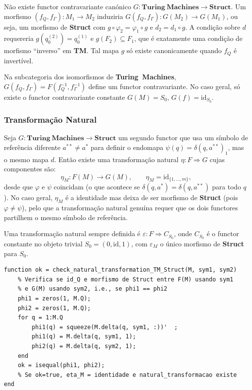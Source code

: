 \begin{proposition}
Não existe functor contravariante canónico $G: \mathbf{Turing\ Machines} \to \mathbf{Struct}$. Um morfismo $(f_Q,f_\Gamma): M_1 \to M_2$ induziria $G(f_Q,f_\Gamma): G(M_2) \to G(M_1)$, ou seja, um morfismo de \textbf{Struct} com $g \circ \varphi_2 = \varphi_1 \circ g$ e $d_2 = d_1 \circ g$. A condição sobre $d$ requereria $g(q_0^{(2)}) = q_0^{(1)}$ e $g(F_2) \subseteq F_1$, que é exatamente uma condição de morfismo ``inverso'' em \textbf{TM}. Tal mapa $g$ só existe canonicamente quando $f_Q$ é invertível.
\end{proposition}

\begin{remark}
Na subcategoria dos isomorfismos de \textbf{Turing\ Machines}, $G(f_Q,f_\Gamma) = F(f_Q^{-1}, f_\Gamma^{-1})$ define um functor contravariante. No caso geral, só existe o functor contravariante constante $G(M) = S_0$, $G(f) = \mathrm{id}_{S_0}$.
\end{remark}

\subsubsection{Transformação Natural}

Seja $G: \mathbf{Turing\ Machines} \to \mathbf{Struct}$ um segundo functor que usa um símbolo de referência diferente $a^{**} \neq a^*$ para definir o endomapa $\psi(q) = \delta(q, a^{**})_1$, mas o mesmo mapa $d$. Então existe uma transformação natural $\eta: F \Rightarrow G$ cujas componentes são:
\[
    \eta_M : F(M) \to G(M), \qquad \eta_M = \mathrm{id}_{\{1,\ldots,m\}},
\]
desde que $\varphi$ e $\psi$ coincidam (o que acontece se $\delta(q, a^*) = \delta(q, a^{**})$ para todo $q$). No caso geral, $\eta_M$ é a identidade mas deixa de ser morfismo de \textbf{Struct} (pois $\varphi \neq \psi$), pelo que a transformação natural genuína requer que os dois functores partilhem o mesmo símbolo de referência.

Uma transformação natural sempre definida é $\varepsilon: F \Rightarrow C_{S_0}$, onde $C_{S_0}$ é o functor constante no objeto trivial $S_0 = (0, \mathrm{id}, 1)$, com $\varepsilon_M$ o único morfismo de \textbf{Struct} para $S_0$.

\begin{lstlisting}[style=matlab, caption={Transformação natural $\eta: F \Rightarrow G$ (mudança de símbolo de referência)}]
function ok = check_natural_transformation_TM_Struct(M, sym1, sym2)
    % Verifica se id_Q e morfismo de Struct entre F(M) usando sym1
    % e G(M) usando sym2, i.e., se phi1 == phi2
    phi1 = zeros(1, M.Q);
    phi2 = zeros(1, M.Q);
    for q = 1:M.Q
        phi1(q) = squeeze(M.delta(q, sym1, :))'  ;
        phi1(q) = M.delta(q, sym1, 1);
        phi2(q) = M.delta(q, sym2, 1);
    end
    ok = isequal(phi1, phi2);
    % Se ok=true, eta_M = identidade e natural_transformacao existe
end
\end{lstlisting}